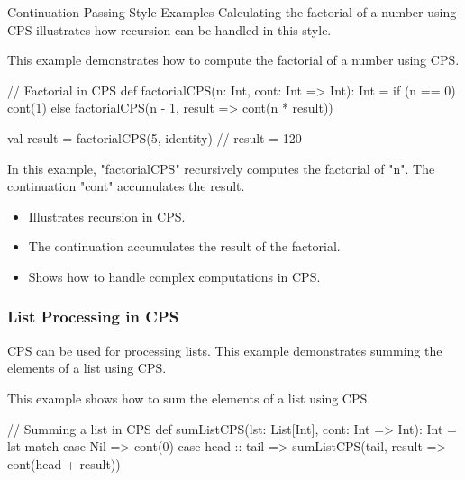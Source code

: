 \begin{notes}{Continuation Passing Style Examples}
    Calculating the factorial of a number using CPS illustrates how recursion can be handled in this style.
    
    \begin{highlight}
    
        This example demonstrates how to compute the factorial of a number using CPS.
    
    \begin{code}[Scala]
    // Factorial in CPS
    def factorialCPS(n: Int, cont: Int => Int): Int =
        if (n == 0) cont(1)
        else factorialCPS(n - 1, result => cont(n * result))
    
    val result = factorialCPS(5, identity)  // result = 120
    \end{code}
    
        In this example, "factorialCPS" recursively computes the factorial of "n". The continuation "cont" accumulates the result.
    
        \begin{itemize}
            \item Illustrates recursion in CPS.
            \item The continuation accumulates the result of the factorial.
            \item Shows how to handle complex computations in CPS.
        \end{itemize}
    
    \end{highlight}
    
    \subsubsection*{List Processing in CPS}
    
    CPS can be used for processing lists. This example demonstrates summing the elements of a list using CPS.
    
    \begin{highlight}
    
        This example shows how to sum the elements of a list using CPS.
    
    \begin{code}[Scala]
    // Summing a list in CPS
    def sumListCPS(lst: List[Int], cont: Int => Int): Int =
        lst match {
            case Nil => cont(0)
            case head :: tail => sumListCPS(tail, result => cont(head + result))
        }
    

\end{code}
\end{highlight}
\end{notes}
